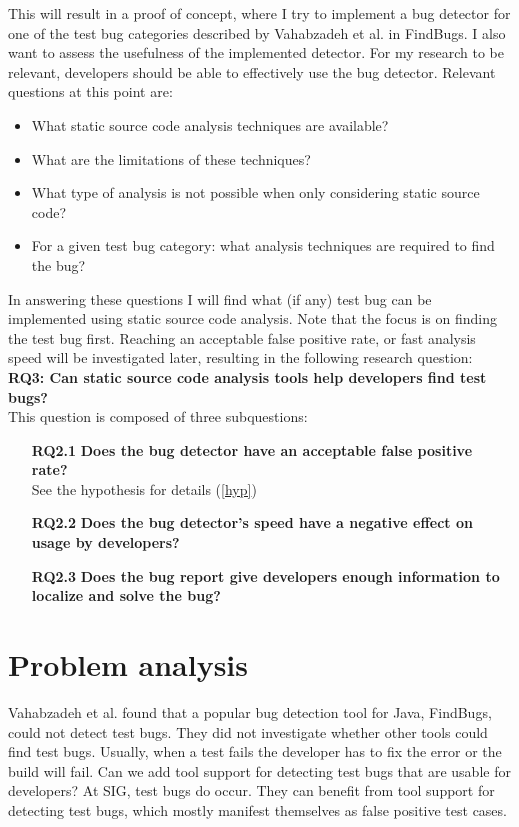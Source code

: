 \documentclass{uvamscse}
\newcommand{\Atestbugs}{Vahabzadeh et al.}
\begin{document}
This will result in a proof of concept, where I try to implement a bug detector for one of the test bug categories described by \Atestbugs{} in FindBugs. I also want to assess the usefulness of the implemented detector. For my research to be relevant, developers should be able to effectively use the bug detector. Relevant questions at this point are: 
\begin{itemize}
	\item What static source code analysis techniques are available?
	\item What are the limitations of these techniques?
	\item What type of analysis is not possible when only considering  static source code?
	\item For a given test bug category: what analysis techniques are required to find the bug?
\end{itemize}
In answering these questions I will find what (if any) test bug can be implemented using static source code analysis. Note that the focus is on finding the test bug first. Reaching an acceptable false positive rate, or fast analysis speed will be investigated later, resulting in the following research question: \\

\textbf{RQ3: Can static source code analysis tools help developers find test bugs? }\\

This question is composed of three subquestions: 
\begin{enumerate}
	\item[\textbf{RQ2.1}] \label{RQ_2_1}  
	\textbf{Does the bug detector have an acceptable false positive rate?} \\
	See the hypothesis for details (\ref{hyp})
	\item[\textbf{RQ2.2}] \label{RQ_2_2} \textbf{Does the bug detector's speed have a negative effect on usage by developers?} \\
	
	\item[\textbf{RQ2.3}] \label{RQ_2_3} \textbf{Does the bug report give developers enough information to localize and solve the bug?}
\end{enumerate}

\section{Problem analysis}

\Atestbugs{} found that a popular bug detection tool for Java, FindBugs, could not detect test bugs. They did not investigate whether other tools could find test bugs. Usually, when a test fails the developer has to fix the error or the build will fail. Can we add tool support for detecting test bugs that are usable for developers? At SIG, test bugs do occur. They can benefit from tool support for detecting test bugs, which mostly manifest themselves as false positive test cases. 
\end{document}
